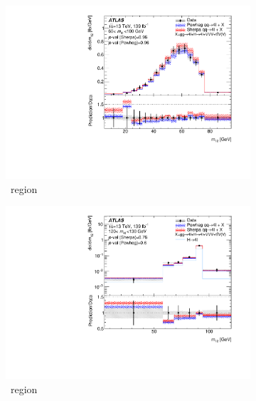 \begin{figure}[htb!]
    \begin{subfigure}{.49\textwidth}\centering
      \includegraphics[width=.99\linewidth]{Figures/m4l/UnfoldedResults/linY_Unfolded_Data_m12_m4l60-100.pdf}  
      \caption{\ZFourL \ region}
      \label{fig:sub-first}
    \end{subfigure}
    \begin{subfigure}{.49\textwidth}\centering
      \includegraphics[width=.99\linewidth]{Figures/m4l/UnfoldedResults/higgs_Unfolded_Data_m12_m4l120-130.pdf}  
      \caption{\HFourL \ region}
      \label{fig:sub-second}
    \end{subfigure}
    \begin{subfigure}{.49\textwidth}
      \centering

\end{subfigure}
\end{figure}
